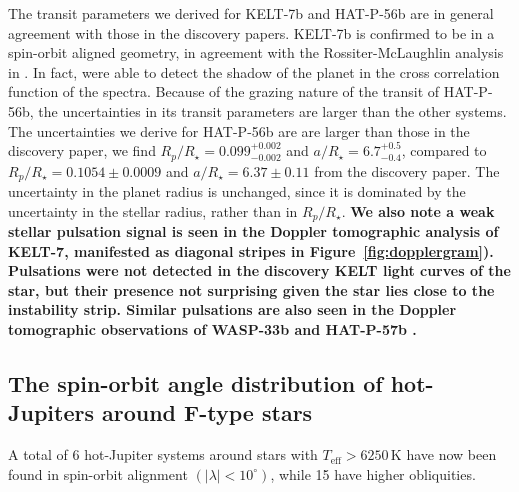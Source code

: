 \documentclass[useAMS,usenatbib]{mn2e}
\begin{document}
The transit parameters we derived for KELT-7b and HAT-P-56b are in general agreement with those in the discovery papers. KELT-7b is confirmed to be in a spin-orbit aligned geometry, in agreement with the Rossiter-McLaughlin analysis in \citet{2015AJ....150...12B}. In fact, \citet{2015AJ....150...12B} were able to detect the shadow of the planet in the cross correlation function of the spectra. Because of the grazing nature of the transit of HAT-P-56b, the uncertainties in its transit parameters are larger than the other systems. The uncertainties we derive for HAT-P-56b are are larger than those in the discovery paper, we find $R_p/R_\star = 0.099_{-0.002}^{+0.002}$ and $a/R_\star = 6.7_{-0.4}^{+0.5}$, compared to $R_p/R_\star = 0.1054\pm0.0009$ and $a/R_\star = 6.37\pm0.11$ from the discovery paper. The uncertainty in the planet radius is unchanged, since it is dominated by the uncertainty in the stellar radius, rather than in $R_p/R_\star$. \textbf{We also note a weak stellar pulsation signal is seen in the Doppler tomographic analysis of KELT-7, manifested as diagonal stripes in Figure~\ref{fig:dopplergram}). Pulsations were not detected in the discovery KELT light curves of the star, but their presence not surprising given the star lies close to the instability strip. Similar pulsations are also seen in the Doppler tomographic observations of WASP-33b \citep{2010MNRAS.407..507C,2015ApJ...810L..23J} and HAT-P-57b \citep{2015AJ....150..197H}. }

\subsection{The spin-orbit angle distribution of hot-Jupiters around F-type stars}
\label{sec:stats}

A total of 6 hot-Jupiter systems around stars with $T_\text{eff} > 6250\,\text{K}$ have now been found in spin-orbit alignment $(|\lambda| < 10^\circ)$, while 15 have higher obliquities.
\end{document}
